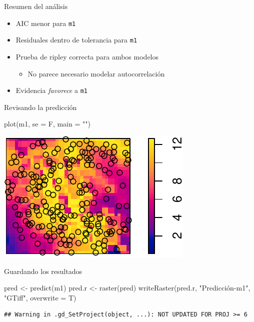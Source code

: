\documentclass[
  11pt,
  ignorenonframetext,
]{beamer}
\newenvironment{Shaded}{}{}
\newcommand{\AttributeTok}[1]{\textcolor[rgb]{0.49,0.56,0.16}{#1}}
\newcommand{\FunctionTok}[1]{\textcolor[rgb]{0.02,0.16,0.49}{#1}}
\newcommand{\NormalTok}[1]{#1}
\newcommand{\OtherTok}[1]{\textcolor[rgb]{0.00,0.44,0.13}{#1}}
\newcommand{\StringTok}[1]{\textcolor[rgb]{0.25,0.44,0.63}{#1}}
\providecommand{\tightlist}{%
  \setlength{\itemsep}{0pt}\setlength{\parskip}{0pt}}
\begin{document}
\begin{frame}[fragile]{Resumen del análisis}
\protect\hypertarget{resumen-del-anuxe1lisis}{}
\begin{itemize}
\item
  AIC menor para \texttt{m1}
\item
  Residuales dentro de tolerancia para \texttt{m1}
\item
  Prueba de ripley correcta para ambos modelos

  \begin{itemize}
  \tightlist
  \item
    No parece necesario modelar autocorrelación
  \end{itemize}
\item
  Evidencia \emph{favorece} a \texttt{m1}
\end{itemize}
\end{frame}

\begin{frame}[fragile]{Revisando la predicción}
\protect\hypertarget{revisando-la-predicciuxf3n}{}
\begin{Shaded}
\begin{Highlighting}[]
\FunctionTok{plot}\NormalTok{(m1, }\AttributeTok{se =}\NormalTok{ F, }\AttributeTok{main =} \StringTok{""}\NormalTok{)}
\end{Highlighting}
\end{Shaded}

\includegraphics{Tutorial-spatstat-2_files/figure-beamer/unnamed-chunk-22-1.pdf}
\end{frame}

\begin{frame}[fragile]{Guardando los resultados}
\protect\hypertarget{guardando-los-resultados}{}
\begin{Shaded}
\begin{Highlighting}[]
\NormalTok{pred }\OtherTok{\textless{}{-}} \FunctionTok{predict}\NormalTok{(m1)}
\NormalTok{pred.r }\OtherTok{\textless{}{-}} \FunctionTok{raster}\NormalTok{(pred)}
\FunctionTok{writeRaster}\NormalTok{(pred.r, }\StringTok{"Predicción{-}m1"}\NormalTok{, }\StringTok{"GTiff"}\NormalTok{,}
            \AttributeTok{overwrite =}\NormalTok{ T)}
\end{Highlighting}
\end{Shaded}

\begin{verbatim}
## Warning in .gd_SetProject(object, ...): NOT UPDATED FOR PROJ >= 6
\end{verbatim}
\end{frame}
\end{document}
